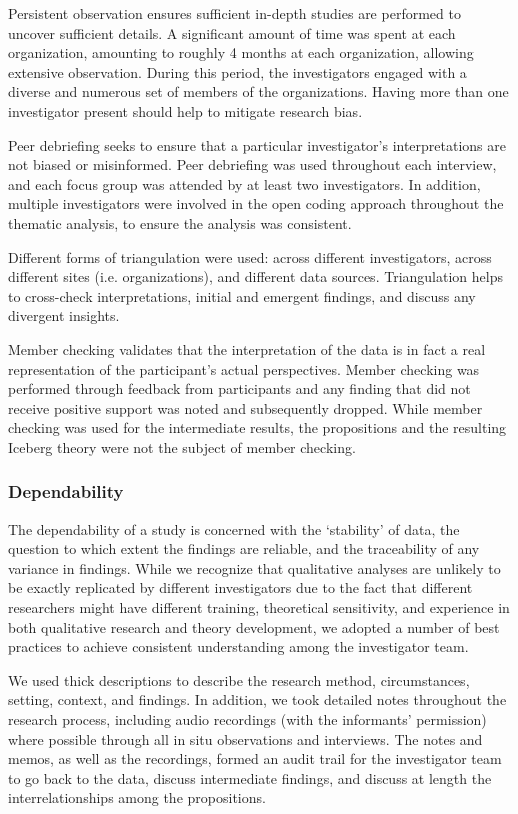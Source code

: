 \documentclass[smallextended]{svjour3}
\begin{document}
{Persistent observation} ensures sufficient in-depth studies are performed to uncover sufficient details.
A significant amount of time was spent at each organization, amounting to roughly 4 months at each organization, allowing extensive observation. 
During this period, the investigators engaged with a diverse and numerous set of members of the organizations. 
Having more than one investigator present should help to mitigate research bias.

{Peer debriefing} seeks to ensure that a particular investigator's interpretations are not biased or misinformed.
Peer debriefing was used throughout each interview, and each focus group was attended by at least two investigators.
In addition, multiple investigators were involved in the open coding approach throughout the thematic analysis, to ensure the analysis was consistent.

Different forms of {triangulation} were used: across different investigators, across different sites (i.e. organizations), and different data sources. Triangulation helps to cross-check interpretations, initial and emergent findings, and discuss any divergent insights.


Member checking validates that the interpretation of the data is in fact a real representation of the participant's actual perspectives.
Member checking was performed through feedback from participants and any finding that did not receive positive support was noted and subsequently dropped. While member checking was used for the intermediate results, the propositions and the resulting Iceberg theory were not the subject of member checking. 



\subsubsection{Dependability}

The dependability of a study is concerned with the `stability' of data, the question to which extent the findings are reliable, and the traceability of any variance in findings. While we recognize that qualitative analyses are unlikely to be exactly replicated by different investigators due to the fact that different researchers might have different training, theoretical sensitivity, and experience in both qualitative research and theory development, we adopted a number of best practices to achieve consistent understanding among the investigator team. 

We used thick descriptions to describe the research method, circumstances, setting, context, and findings. 
In addition, we took detailed notes throughout the research process, including audio recordings (with the informants' permission) where possible through all in situ observations and interviews.
The notes and memos, as well as the recordings, formed an audit trail for the investigator team to go back to the data, discuss intermediate findings, and discuss at length the interrelationships among the propositions. 
\end{document}

